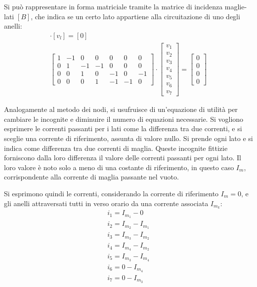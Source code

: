 \documentclass{article}
\numberwithin{equation}{subsection}
\begin{document}
Si può rappresentare in forma matriciale tramite la matrice di incidenza maglie-lati $[B]$, che  indica se un certo lato appartiene alla circuitazione di uno degli anelli:
\begin{gather*}
    [B]\cdot[v_l]=[0]\\
    \begin{bmatrix}
        1&-1&0&0&0&0&0\\
        0&1&-1&-1&0&0&0\\
        0&0&1&0&-1&0&-1\\
        0&0&0&1&-1&-1&0
    \end{bmatrix}\cdot\begin{bmatrix}
        v_1\\v_2\\v_3\\v_4\\v_5\\v_6\\v_7
    \end{bmatrix}=\begin{bmatrix}
        0\\0\\0\\0
    \end{bmatrix}
\end{gather*}


Analogamente al metodo dei nodi, si usufruisce di un'equazione di utilità per cambiare le incognite e diminuire il numero di equazioni necessarie. Si vogliono esprimere 
le correnti passanti per i lati come la differenza tra due correnti, e si sceglie una corrente di riferimento, assunta di valore nullo. Si prende ogni lato e si indica come 
differenza tra due correnti di maglia. Queste incognite fittizie forniscono dalla loro differenza il valore delle correnti passanti per ogni lato. Il loro valore è noto 
solo a meno di una costante di riferimento, in questo caso $I_m$, corrispondente alla corrente di maglia passante nel vuoto. 

Si esprimono quindi le correnti, considerando la corrente di riferimento $I_m=0$, e gli anelli attraversati tutti in verso orario da una corrente associata $I_{m_k}$:
\begin{gather*}
    i_1=I_{m_1}-0\\
    i_2=I_{m_2}-I_{m_1}\\
    i_3=I_{m_3}-I_{m_2}\\
    i_4=I_{m_4}-I_{m_2}\\
    i_5=I_{m_3}-I_{m_4}\\
    i_6=0-I_{m_4}\\
    i_7=0-I_{m_3}
\end{gather*}
\end{document}
